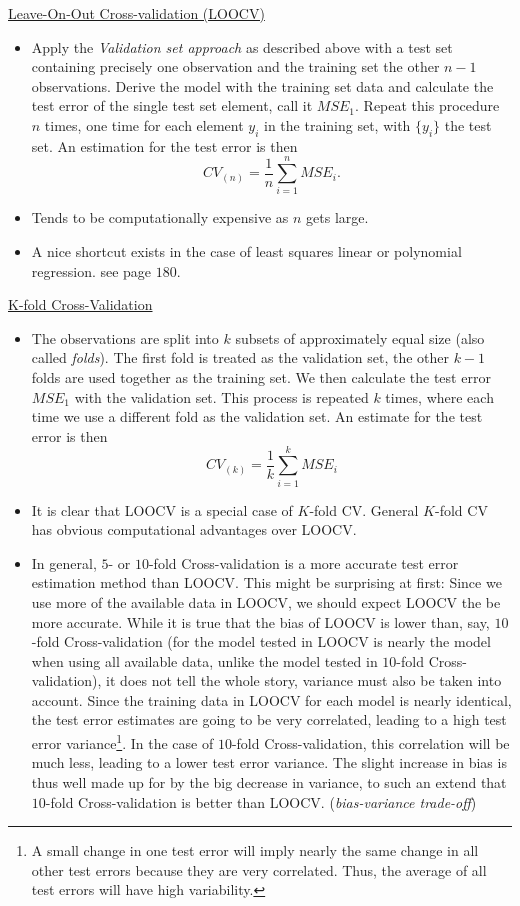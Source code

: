 \underline{Leave-On-Out Cross-validation (LOOCV)}
\begin{itemize}
    \item Apply the \textit{Validation set approach} as described above with a test set containing precisely one observation and the training set the other $n-1$ observations. Derive the model with the training set data and calculate the test error of the single test set element, call it $MSE_1$. Repeat this procedure $n$ times, one time for each element $y_i$ in the training set, with $\{y_i\}$ the test set. An estimation for the test error is then \begin{equation*}
        CV_{(n)} = \frac{1}{n}\sum_{i=1}^n MSE_i.
    \end{equation*}
    \item Tends to be computationally expensive as $n$ gets large.
    \item A nice shortcut exists in the case of least squares linear or polynomial regression. see page $180$.
\end{itemize}

\underline{K-fold Cross-Validation}
\begin{itemize}
    \item The observations are split into $k$ subsets of approximately equal size (also called \textit{folds}). The first fold is treated as the validation set, the other $k-1$ folds are used together as the training set. We then calculate the test error $MSE_1$ with the validation set. This process is repeated $k$ times, where each time we use a different fold as the validation set. An estimate for the test error is then \begin{equation*}
        CV_(k) = \frac{1}{k}\sum_{i=1}^k MSE_i
    \end{equation*}
    \item It is clear that LOOCV is a special case of $K$-fold CV. General $K$-fold CV has obvious computational advantages over LOOCV.
    \item In general, $5$- or $10$-fold Cross-validation is a more accurate test error estimation method than LOOCV. This might be surprising at first: Since we use more of the available data in LOOCV, we should expect LOOCV the be more accurate. While it is true that the bias of LOOCV is lower than, say, $10$-fold Cross-validation (for the model tested in LOOCV is nearly the model when using all available data, unlike the model tested in $10$-fold Cross-validation), it does not tell the whole story, variance must also be taken into account. Since the training data in LOOCV for each model is nearly identical, the test error estimates are going to be very correlated, leading to a high test error variance\footnote{A small change in one test error will imply nearly the same change in all other test errors because they are very correlated. Thus, the average of all test errors will have high variability.}. In the case of $10$-fold Cross-validation, this correlation will be much less, leading to a lower test error variance. The slight increase in bias is thus well made up for by the big decrease in variance, to such an extend that $10$-fold Cross-validation is better than LOOCV. (\textit{bias-variance trade-off})
\end{itemize}

